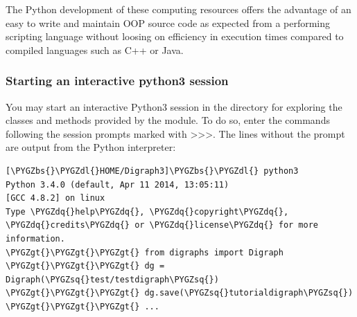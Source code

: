 \documentclass[letterpaper,10pt,english]{sphinxmanual}
\def\PYGZbs{\char`\\}
\def\PYGZgt{\char`\>}
\def\PYGZdl{\char`\$}
\def\PYGZsq{\char`\'}
\def\PYGZdq{\char`\"}
\begin{document}
The Python development of these computing resources offers the advantage of an easy to write and maintain OOP source code as expected from a performing scripting language without loosing on efficiency in execution times compared to compiled languages such as C++ or Java.


\subsubsection{Starting an interactive python3 session}
\label{tutorial:starting-an-interactive-python3-session}
You may start an interactive Python3 session in the  directory for exploring the classes and methods provided by the  module. To do so, enter the  commands following the session prompts marked with \textgreater{}\textgreater{}\textgreater{}. The lines without the prompt are output from the Python interpreter:

\begin{Verbatim}[commandchars=\\\{\}]
[\PYGZbs{}\PYGZdl{}HOME/Digraph3]\PYGZbs{}\PYGZdl{} python3
Python 3.4.0 (default, Apr 11 2014, 13:05:11)
[GCC 4.8.2] on linux
Type \PYGZdq{}help\PYGZdq{}, \PYGZdq{}copyright\PYGZdq{}, \PYGZdq{}credits\PYGZdq{} or \PYGZdq{}license\PYGZdq{} for more information.
\PYGZgt{}\PYGZgt{}\PYGZgt{} from digraphs import Digraph
\PYGZgt{}\PYGZgt{}\PYGZgt{} dg = Digraph(\PYGZsq{}test/testdigraph\PYGZsq{})
\PYGZgt{}\PYGZgt{}\PYGZgt{} dg.save(\PYGZsq{}tutorialdigraph\PYGZsq{})
\PYGZgt{}\PYGZgt{}\PYGZgt{} ...
\end{Verbatim}
\end{document}

